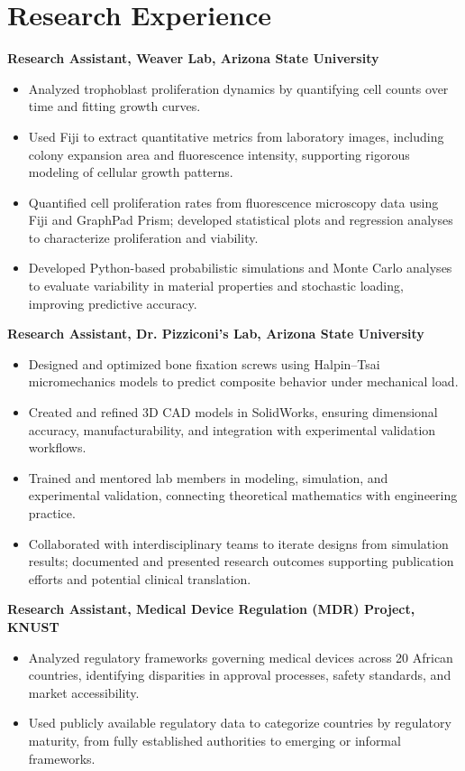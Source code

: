 \documentclass[10.5pt]{article}
\newcommand{\cventry}[2]{%
  \par\noindent\textbf{#1}\hfill\makebox[1.4in][r]{#2}\par
}
\begin{document}
\section*{Research Experience}

\cventry{Research Assistant, Weaver Lab, Arizona State University}{2021--2022}
\begin{itemize}
  \item Analyzed trophoblast proliferation dynamics by quantifying cell counts over time and fitting growth curves.
  \item Used Fiji to extract quantitative metrics from laboratory images, including colony expansion area and
  fluorescence intensity, supporting rigorous modeling of cellular growth patterns.
  \item Quantified cell proliferation rates from fluorescence microscopy data using Fiji and GraphPad Prism;
  developed statistical plots and regression analyses to characterize proliferation and viability.
  \item Developed Python-based probabilistic simulations and Monte Carlo analyses to evaluate variability in
  material properties and stochastic loading, improving predictive accuracy.
\end{itemize}

\cventry{Research Assistant, Dr. Pizziconi's Lab, Arizona State University}{2022--2023}
\begin{itemize}
  \item Designed and optimized bone fixation screws using Halpin--Tsai micromechanics models to predict composite
  behavior under mechanical load.
  \item Created and refined 3D CAD models in SolidWorks, ensuring dimensional accuracy, manufacturability, and
  integration with experimental validation workflows.
  \item Trained and mentored lab members in modeling, simulation, and experimental validation, connecting
  theoretical mathematics with engineering practice.
  \item Collaborated with interdisciplinary teams to iterate designs from simulation results; documented and
  presented research outcomes supporting publication efforts and potential clinical translation.
\end{itemize}

\cventry{Research Assistant, Medical Device Regulation (MDR) Project, KNUST}{2020--2021}
\begin{itemize}
  \item Analyzed regulatory frameworks governing medical devices across 20 African countries, identifying
  disparities in approval processes, safety standards, and market accessibility.
  \item Used publicly available regulatory data to categorize countries by regulatory maturity, from fully
  established authorities to emerging or informal frameworks.
\end{itemize}
\end{document}

